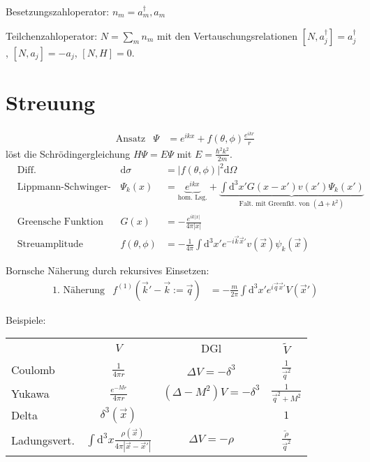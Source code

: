 \documentclass[10pt,a4paper,notitlepage]{scrartcl}
\newcommand{\dif}{\mathrm{d}}
\begin{document}
Besetzungszahloperator: $n_m = a_m^\dagger, a_m$

Teilchenzahloperator: $N = \sum_m n_m$ mit den Vertauschungsrelationen $[N, a_j^\dagger] = a_j^\dagger$, $[N, a_j] = -a_j$, $[N, H] = 0$.

\section*{Streuung}

\begin{align*}
    &\text{Ansatz}& \Psi &= e^{i k x} + f(\theta, \phi) \frac{e^{i k r}}{r}
\end{align*}
löst die Schrödingergleichung $H\Psi = E\Psi$ mit $E = \frac{\hbar^2 k^2}{2 m}$.
\begin{align*}
    &\text{Diff. Wirkungsquerschnitt}& \dif \sigma &= |f(\theta, \phi)|^2 \dif \Omega \\
    &\text{Lippmann-Schwinger-Gl.} & \Psi_k(x) &= \underbrace{e^{i k x}}_{\text{hom. Lsg.}} + \underbrace{\int \dif^3 x' G(x - x') v(x') \Psi_k(x')}_{\text{Falt. mit Greenfkt. von } (\Delta + k^2)} \\
    & \text{Greensche Funktion} & G(x) &= -\frac{e^{i k |x|}}{4\pi |x|} \\
    &\text{Streuamplitude} & f(\theta, \phi) &= -\frac{1}{4\pi} \int \dif^3 x' e^{-i \vec{k} \vec{x}'} v(\vec{x}) \psi_k(\vec{x})
\end{align*}

Bornsche Näherung durch rekursives Einsetzen:
\begin{align*}
    &\text{1. Näherung}& f^{(1)}(\vec{k}' - \vec{k} := \vec{q}) &= -\frac{m}{2\pi} \int \dif^3 x' e^{i \vec{q} \vec{x}'} V(\vec{x}')
\end{align*}

Beispiele:
\begin{table}[htb]
    \centering
    \begin{tabular}{lccc}
        & $V$ & DGl & $\tilde{V}$ \\
        Coulomb & $\frac{1}{4 \pi r}$ & $\Delta V = -\delta^3$ & $\frac{1}{\vec{q}^2}$ \\
        Yukawa & $\frac{e^{-M r}}{4 \pi r}$ & $(\Delta - M^2) V = -\delta^3$ & $\frac{1}{\vec{q}^2 + M^2}$ \\
        Delta & $\delta^3(\vec{x})$ &  & $1$ \\
        Ladungsvert. & $\int \dif^3 x \frac{\rho(\vec{x})}{4 \pi |\vec{x} - \vec{x}'|}$ & $\Delta V = - \rho$ & $\frac{\tilde{\rho}}{\vec{q}^2}$ \\
    \end{tabular}
\end{table}
\end{document}
